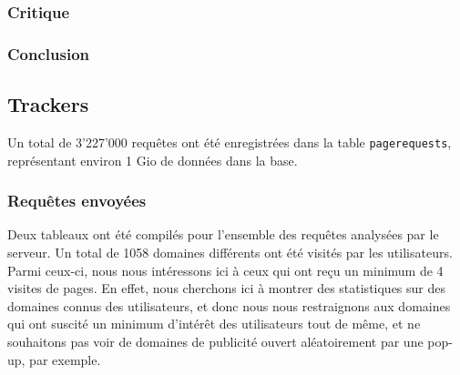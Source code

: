 		\subsubsection{Critique}

		\subsubsection{Conclusion}

	\subsection{Trackers}

		Un total de 3'227'000 requêtes ont été enregistrées dans la table \texttt{pagerequests}, représentant environ 1 Gio de données dans la base. 

		\subsubsection{Requêtes envoyées}

			Deux tableaux ont été compilés pour l'ensemble des requêtes analysées par le serveur. Un total de 1058 domaines différents ont été visités par les utilisateurs. Parmi ceux-ci, nous nous intéressons ici à ceux qui ont reçu un minimum de 4 visites de pages. En effet, nous cherchons ici à montrer des statistiques sur des domaines connus des utilisateurs, et donc nous nous restraignons aux domaines qui ont suscité un minimum d'intérêt des utilisateurs tout de même, et ne souhaitons pas voir de domaines de publicité ouvert aléatoirement par une pop-up, par exemple.

